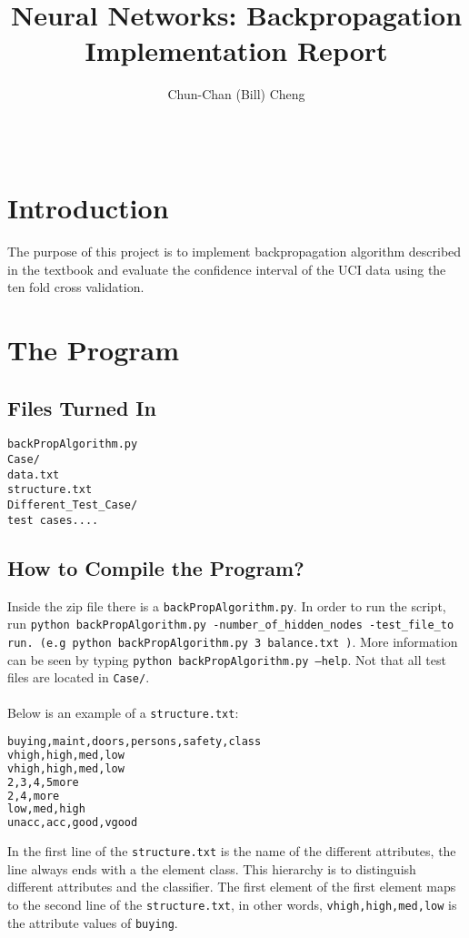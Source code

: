 \documentclass{sig-alternate-05-2015}
\begin{document}
\title{Neural Networks: Backpropagation Implementation Report}
\author{
Chun-Chan (Bill) Cheng\\
        \\
       \\
 }

\maketitle
\section{Introduction}
The purpose of this project is to implement backpropagation algorithm described in the textbook and evaluate the confidence interval of the UCI data using the ten fold cross validation. 

\section{The Program}
\subsection{Files Turned In}

\texttt{backPropAlgorithm.py\\
\indent Case/\\
\indent\indent data.txt\\
\indent\indent structure.txt\\
\indent\indent Different\_Test\_Case/\\
\indent\indent\indent\indent test cases....
}

\subsection{How to Compile the Program?}
Inside the zip file there is a \texttt{backPropAlgorithm.py}. In order to run the script, run \texttt{python backPropAlgorithm.py -number\_of\_hidden\_nodes -test\_file\_to run. (e.g python backPropAlgorithm.py 3 balance.txt )}. More information can be seen by typing \texttt{python backPropAlgorithm.py --help}. Not that all test files are located in \texttt{Case/}.\\\\
Below is an example of a \texttt{structure.txt}:
\begin{lstlisting}[language=bash]
buying,maint,doors,persons,safety,class
vhigh,high,med,low
vhigh,high,med,low
2,3,4,5more
2,4,more
low,med,high
unacc,acc,good,vgood
\end{lstlisting}
In the first line of the \texttt{structure.txt} is the name of the different attributes, the line always ends with a the element class. This hierarchy is to distinguish different attributes and the classifier. The first element of the first element maps to the second line of the \texttt{structure.txt}, in other words, \texttt{vhigh,high,med,low} is the attribute values of \texttt{buying}.
\end{document}
